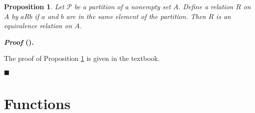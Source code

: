 \documentclass[12pt,a4paper]{article}
\newtheorem{prop}{Proposition}[section]
\newcounter{nprf}[subsection]
\newenvironment*{prf}{\par\indent\textbf{\textit{Proof} (\stepcounter{nprf}\thenprf). }\par }{\par\hfill $\blacksquare$\par}
\def\part{{\mathscr{P}}}
\begin{document}
\begin{prop}\label{prop4.2.3} Let $\part$ be a partition of a nonempty set $A$. Define a relation $R$ on $A$ by $aRb$ if $a$ and $b$ are in the same element of the partition. Then $R$ is an equivalence relation on $A$. \end{prop}
\begin{prf} The proof of Proposition \ref{prop4.2.3} is given in the textbook. \end{prf}


\newpage
\section{Functions}
\end{document}
